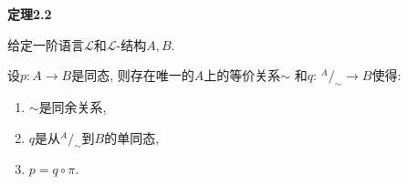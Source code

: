 \vspace{10pt}

\hypertarget{sec:定理2.2}{}
\noindent\textbf{定理2.2}

给定一阶语言$\mathcal{L}$和$\mathcal{L}$-结构$A,B$.

设$p:A\to B$是同态, 则存在唯一的$A$上的等价关系$\sim$
和$q:\,^{\displaystyle A}\!/_{\displaystyle\sim}\to B$使得:
\begin{enumerate}
    \item $\sim$是同余关系,
    \vspace{3pt}
    \item $q$是从$^{\displaystyle A}\!/_{\displaystyle\sim}$到$B$的单同态,
    \item $p=q\circ\pi$.
\end{enumerate}



